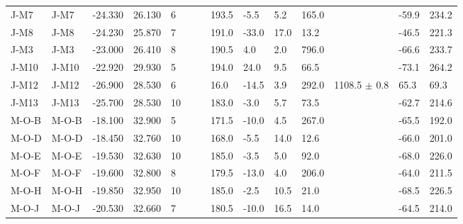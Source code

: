\documentclass[11pt,letterpaper]{article}
\begin{document}
\begin{table}[!ht]
\begin{adjustwidth}{-0.0in}{0in}
\begin{tiny}
\begin{tabular}{p{2.0 cm}p{1.25 cm}llllllllllll}
J-M7                     &                                 J-M7 &   -24.330 &     26.130 &    6 &     &    &   193.5 &    -5.5 &   5.2 &  165.0 &      &     -59.9 &      234.2 \\
J-M8                     &                                 J-M8 &   -24.230 &     25.870 &    7 &     &    &   191.0 &   -33.0 &  17.0 &   13.2 &      &     -46.5 &      221.3 \\
J-M3                     &                                 J-M3 &   -23.000 &     26.410 &    8 &     &    &   190.5 &     4.0 &   2.0 &  796.0 &      &     -66.6 &      233.7 \\
J-M10                    &                                J-M10 &   -22.920 &     29.930 &    5 &     &    &   194.0 &    24.0 &   9.5 &   66.5 &      &     -73.1 &      264.2 \\
J-M12                    &                                J-M12 &   -26.900 &     28.530 &    6 &     &    &    16.0 &   -14.5 &   3.9 &  292.0 &  1108.5 $\pm$ 0.8 &      65.3 &       69.3 \\
J-M13                    &                                J-M13 &   -25.700 &     28.530 &   10 &     &    &   183.0 &    -3.0 &   5.7 &   73.5 &      &     -62.7 &      214.6 \\
M-O-B                    &                                M-O-B &   -18.100 &     32.900 &    5 &     &    &   171.5 &   -10.0 &   4.5 &  267.0 &      &     -65.5 &      192.0 \\
M-O-D                    &                                M-O-D &   -18.450 &     32.760 &   10 &     &    &   168.0 &    -5.5 &  14.0 &   12.6 &      &     -66.0 &      201.0 \\
M-O-E                    &                                M-O-E &   -19.530 &     32.630 &   10 &     &    &   185.0 &    -3.5 &   5.0 &   92.0 &      &     -68.0 &      226.0 \\
M-O-F                    &                                M-O-F &   -19.600 &     32.800 &    8 &     &    &   179.5 &   -13.0 &   4.0 &  206.0 &      &     -64.0 &      211.5 \\
M-O-H                    &                                M-O-H &   -19.850 &     32.950 &   10 &     &    &   185.0 &    -2.5 &  10.5 &   21.0 &      &     -68.5 &      226.5 \\
M-O-J                    &                                M-O-J &   -20.530 &     32.660 &    7 &     &    &   180.5 &   -10.0 &  16.5 &   14.0 &      &     -64.5 &      214.0 \\

\end{tabular}
\end{tiny}
\end{adjustwidth}
\end{table}
\end{document}
